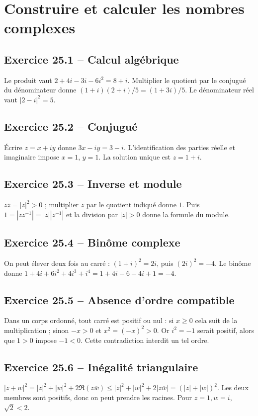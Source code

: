 \chapter{Construire et calculer les nombres complexes}
\section*{Exercice 25.1 -- Calcul algébrique}
Le produit vaut $2+4i-3i-6i^2=8+i$. Multiplier le quotient par le conjugué du dénominateur donne $(1+i)(2+i)/5=(1+3i)/5$. Le dénominateur réel vaut $|2-i|^2=5$.

\section*{Exercice 25.2 -- Conjugué}
Écrire $z=x+i y$ donne $3x-i y=3-i$. L'identification des parties réelle et imaginaire impose $x=1$, $y=1$. La solution unique est $z=1+i$.

\section*{Exercice 25.3 -- Inverse et module}
$z\overline z=|z|^2>0$ ; multiplier $z$ par le quotient indiqué donne $1$. Puis $1=|zz^{-1}|=|z||z^{-1}|$ et la division par $|z|>0$ donne la formule du module.

\section*{Exercice 25.4 -- Binôme complexe}
On peut élever deux fois au carré : $(1+i)^2=2i$, puis $(2i)^2=-4$. Le binôme donne $1+4i+6i^2+4i^3+i^4=1+4i-6-4i+1=-4$.

\section*{Exercice 25.5 -- Absence d’ordre compatible}
Dans un corps ordonné, tout carré est positif ou nul : si $x\ge0$ cela suit de la multiplication ; sinon $-x>0$ et $x^2=(-x)^2>0$. Or $i^2=-1$ serait positif, alors que $1>0$ impose $-1<0$. Cette contradiction interdit un tel ordre.

\section*{Exercice 25.6 -- Inégalité triangulaire}
$|z+w|^2=|z|^2+|w|^2+2\Re(z\overline w)\le|z|^2+|w|^2+2|z\overline w|=(|z|+|w|)^2$. Les deux membres sont positifs, donc on peut prendre les racines. Pour $z=1,w=i$, $\sqrt2<2$.
